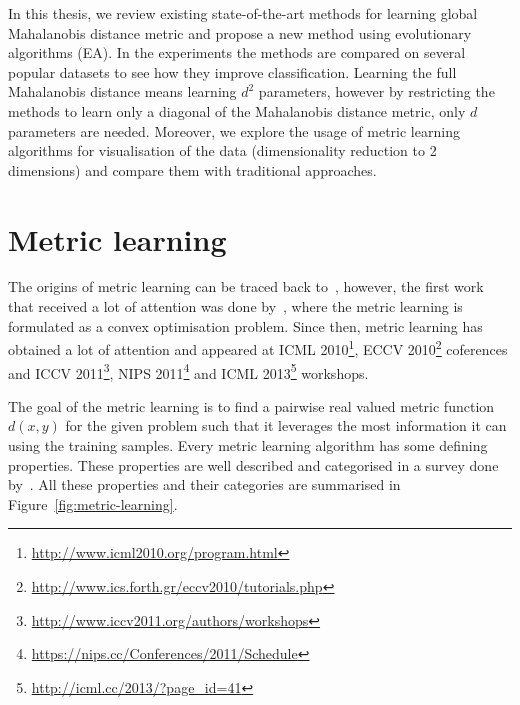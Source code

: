 In this thesis, we review existing state-of-the-art methods for learning global Mahalanobis distance metric and propose a new method using evolutionary algorithms (EA). In the experiments the methods are compared on several popular datasets to see how they improve classification. Learning the full Mahalanobis distance means learning $d^2$ parameters, however by restricting the methods to learn only a diagonal of the Mahalanobis distance metric, only $d$ parameters are needed. Moreover, we explore the usage of metric learning algorithms for visualisation of the data (dimensionality reduction to 2 dimensions) and compare them with traditional approaches.

\section{Metric learning} \label{chap:intro:ml}

The origins of metric learning can be traced back to~\citep{short1981optimal}, however, the first work that received a lot of attention was done by~\citep{xing2002distance}, where the metric learning is formulated as a convex optimisation problem. Since then, metric learning has obtained a lot of attention and appeared at ICML 2010\footnote{\url{http://www.icml2010.org/program.html}}, ECCV 2010\footnote{\url{http://www.ics.forth.gr/eccv2010/tutorials.php}} coferences and ICCV 2011\footnote{\url{http://www.iccv2011.org/authors/workshops}}, NIPS 2011\footnote{\url{https://nips.cc/Conferences/2011/Schedule}} and ICML 2013\footnote{\url{http://icml.cc/2013/?page_id=41}} workshops.

The goal of the metric learning is to find a pairwise real valued metric function $d(x,y)$ for the given problem such that it leverages the most information it can using the training samples. Every metric learning algorithm has some defining properties. These properties are well described and categorised in a survey done by~\citep{bellet2013survey}. All these properties and their categories are summarised in Figure~\ref{fig:metric-learning}.


\newpage

